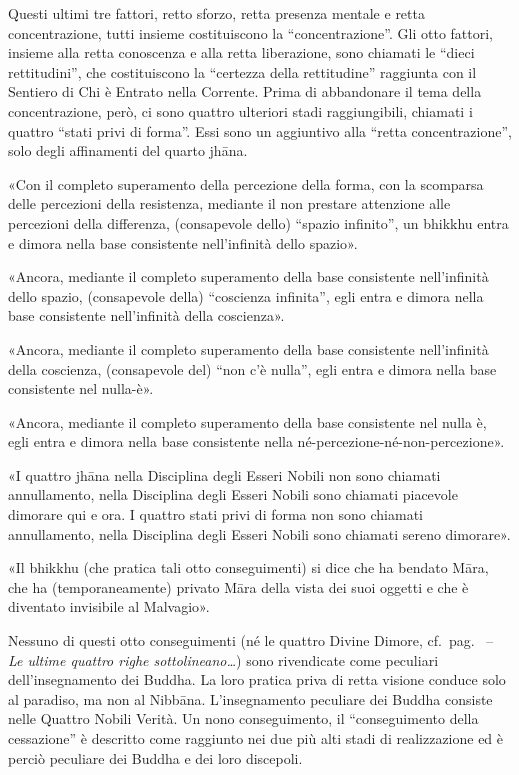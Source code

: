 
 Questi ultimi tre fattori, retto sforzo, retta
presenza mentale e retta concentrazione, tutti insieme costituiscono la
“concentrazione”. Gli otto fattori, insieme alla retta conoscenza e alla retta
liberazione, sono chiamati le “dieci rettitudini”, che costituiscono la
“certezza della rettitudine” raggiunta con il Sentiero di Chi è Entrato nella
Corrente. Prima di abbandonare il tema della concentrazione, però, ci sono
quattro ulteriori stadi raggiungibili, chiamati i quattro “stati privi di
forma”. Essi sono un aggiuntivo alla “retta concentrazione”, solo degli
affinamenti del quarto jhāna.

 «Con il completo superamento della percezione della forma,
con la scomparsa delle percezioni della resistenza, mediante il non prestare
attenzione alle percezioni della differenza, (consapevole dello) “spazio
infinito”, un bhikkhu entra e dimora nella base consistente nell’infinità dello
spazio».

«Ancora, mediante il completo superamento della base consistente nell’infinità
dello spazio, (consapevole della) “coscienza infinita”, egli entra e dimora
nella base consistente nell’infinità della coscienza».

«Ancora, mediante il completo superamento della base consistente nell’infinità
della coscienza, (consapevole del) “non c’è nulla”, egli entra e dimora nella
base consistente nel nulla-è».

«Ancora, mediante il completo superamento della base consistente nel nulla è,
egli entra e dimora nella base consistente nella
né-percezione-né-non-percezione».

«I quattro jhāna nella Disciplina degli Esseri Nobili non sono chiamati
annullamento, nella Disciplina degli Esseri Nobili sono chiamati piacevole
dimorare qui e ora. I quattro stati privi di forma non sono chiamati
annullamento, nella Disciplina degli Esseri Nobili sono chiamati sereno
dimorare».


«Il bhikkhu (che pratica tali otto conseguimenti) si dice che ha bendato Māra,
che ha (temporaneamente) privato Māra della vista dei suoi oggetti e che è
diventato invisibile al Malvagio».


 Nessuno di questi otto conseguimenti (né le
quattro Divine Dimore, cf.~pag.~\pageref{pag200b} -- \emph{Le ultime quattro
  righe sottolineano\ldots}) sono rivendicate come peculiari dell’insegnamento
dei Buddha. La loro pratica priva di retta visione conduce solo al paradiso, ma
non al Nibbāna. L’insegnamento peculiare dei Buddha consiste nelle Quattro
Nobili Verità. Un nono conseguimento, il “conseguimento della cessazione” è
descritto come raggiunto nei due più alti stadi di realizzazione ed è perciò
peculiare dei Buddha e dei loro discepoli.

